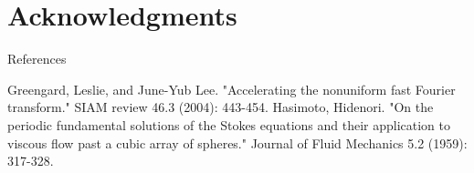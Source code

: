 \documentclass{beamer}
\begin{document}
\section{Acknowledgments}

\begin{frame}{References}
	\begin{thebibliography}{0}
		Greengard, Leslie, and June-Yub Lee. "Accelerating the nonuniform fast Fourier transform." SIAM review 46.3 (2004): 443-454.
		Hasimoto, Hidenori. "On the periodic fundamental solutions of the Stokes equations and their application to viscous flow past a cubic array of spheres." Journal of Fluid Mechanics 5.2 (1959): 317-328.
	\end{thebibliography}
\end{frame}
\end{document}
